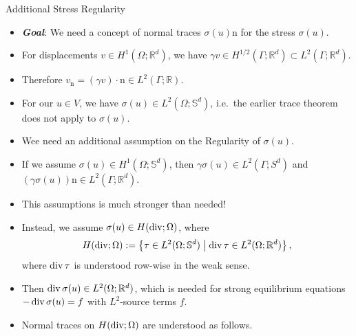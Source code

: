 \documentclass[10pt,aspectratio=169]{beamer}
\def\R{{\mathbb R}}
\def\S{{\mathbb S}}
\newcommand{\diver}{\operatornamewithlimits{div}}
\begin{document}
\begin{frame}{Additional Stress Regularity}
	\begin{itemize}
		\item \textbf{\em Goal}: We need a concept of normal traces $\sigma(u)\mathrm{n}$ for the stress $\sigma(u)$.
		\item For displacements $v\in H^1(\Omega;\R^d)$, we have $\gamma v\in H^{1/2}(\Gamma;\R^d)\subset L^2(\Gamma;\R^d)$.
		\item Therefore $v_\mathrm{n} = (\gamma v)\cdot \mathrm{n} \in L^2(\Gamma;\R)$.
		\item For our $u\in V$, we have $\sigma(u)\in L^2(\Omega;\S^d)$, i.e.\ the earlier trace theorem does not apply to $\sigma(u)$.
		\item Wee need an additional assumption on the Regularity of $\sigma(u)$.
		\item If we assume $\sigma(u)\in H^1(\Omega;\S^d)$, then $\gamma\sigma(u)\in L^2(\Gamma;S^d)$ and $(\gamma\sigma(u))\mathrm{n}\in L^2(\Gamma;\R^d)$.
		\item This assumptions is much stronger than needed!
		\item Instead, we assume $\sigma(u)\in H(\diver;\Omega)$, where
		      \begin{equation*}
			      H(\diver;\Omega):= \left\{\tau\in L^2(\Omega;\S^d)\;\middle|\;\diver\tau\in L^2(\Omega;\R^d)\right\},
		      \end{equation*}
		      where $\diver \tau$ is understood row-wise in the weak sense.
		\item Then $\diver\sigma(u)\in L^2(\Omega;\R^d)$, which is needed for strong equilibrium equations $-\diver\sigma(u) = f$ with $L^2$-source terms $f$.
		\item Normal traces on $H(\diver;\Omega)$ are understood as follows.
	\end{itemize}
\end{frame}
\end{document}
